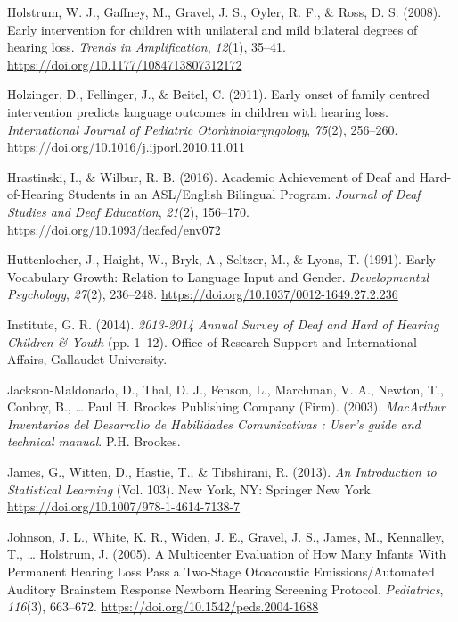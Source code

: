 \documentclass[english,man]{apa6}
\begin{document}
\leavevmode\hypertarget{ref-holstrum2008}{}%
Holstrum, W. J., Gaffney, M., Gravel, J. S., Oyler, R. F., \& Ross, D. S. (2008). Early intervention for children with unilateral and mild bilateral degrees of hearing loss. \emph{Trends in Amplification}, \emph{12}(1), 35--41. \url{https://doi.org/10.1177/1084713807312172}

\leavevmode\hypertarget{ref-holzinger2011}{}%
Holzinger, D., Fellinger, J., \& Beitel, C. (2011). Early onset of family centred intervention predicts language outcomes in children with hearing loss. \emph{International Journal of Pediatric Otorhinolaryngology}, \emph{75}(2), 256--260. \url{https://doi.org/10.1016/j.ijporl.2010.11.011}

\leavevmode\hypertarget{ref-hrastinski2016}{}%
Hrastinski, I., \& Wilbur, R. B. (2016). Academic Achievement of Deaf and Hard-of-Hearing Students in an ASL/English Bilingual Program. \emph{Journal of Deaf Studies and Deaf Education}, \emph{21}(2), 156--170. \url{https://doi.org/10.1093/deafed/env072}

\leavevmode\hypertarget{ref-huttenlocher1991}{}%
Huttenlocher, J., Haight, W., Bryk, A., Seltzer, M., \& Lyons, T. (1991). Early Vocabulary Growth: Relation to Language Input and Gender. \emph{Developmental Psychology}, \emph{27}(2), 236--248. \url{https://doi.org/10.1037/0012-1649.27.2.236}

\leavevmode\hypertarget{ref-gallaudetresearchinstitute2014}{}%
Institute, G. R. (2014). \emph{2013-2014 Annual Survey of Deaf and Hard of Hearing Children \& Youth} (pp. 1--12). Office of Research Support and International Affairs, Gallaudet University.

\leavevmode\hypertarget{ref-jackson-maldonado2003}{}%
Jackson-Maldonado, D., Thal, D. J., Fenson, L., Marchman, V. A., Newton, T., Conboy, B., \ldots{} Paul H. Brookes Publishing Company (Firm). (2003). \emph{MacArthur Inventarios del Desarrollo de Habilidades Comunicativas : User's guide and technical manual}. P.H. Brookes.

\leavevmode\hypertarget{ref-james2013}{}%
James, G., Witten, D., Hastie, T., \& Tibshirani, R. (2013). \emph{An Introduction to Statistical Learning} (Vol. 103). New York, NY: Springer New York. \url{https://doi.org/10.1007/978-1-4614-7138-7}

\leavevmode\hypertarget{ref-johnson2005}{}%
Johnson, J. L., White, K. R., Widen, J. E., Gravel, J. S., James, M., Kennalley, T., \ldots{} Holstrum, J. (2005). A Multicenter Evaluation of How Many Infants With Permanent Hearing Loss Pass a Two-Stage Otoacoustic Emissions/Automated Auditory Brainstem Response Newborn Hearing Screening Protocol. \emph{Pediatrics}, \emph{116}(3), 663--672. \url{https://doi.org/10.1542/peds.2004-1688}
\end{document}
